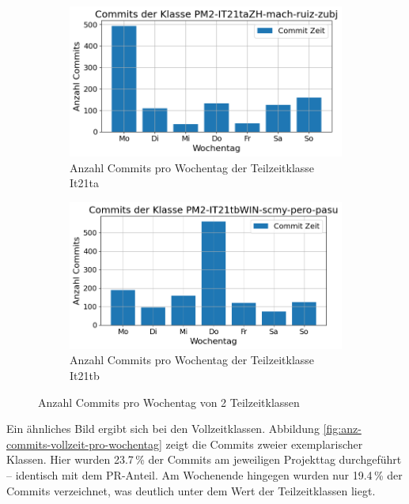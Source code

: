 \begin{figure}[htbp]
    \centering
    \begin{subfigure}[b]{0.48\textwidth}
        \centering
        \includegraphics[width=\textwidth]{Figures/commits-klasse-per-wochentag-21ta.png}
         \caption{Anzahl Commits pro Wochentag der Teilzeitklasse It21ta}
        \label{fig:anzahl-commits-pro-wochentag-it21ta}
    \end{subfigure}
    \hfill
    \begin{subfigure}[b]{0.48\textwidth}
        \centering
        \includegraphics[width=\textwidth]{Figures/commits-klasse-per-wochentag-21tb.png}
         \caption{Anzahl Commits pro Wochentag der Teilzeitklasse It21tb}
        \label{fig:anzahl-commits-pro-wochentag-it21tb}
    \end{subfigure}
    \caption{Anzahl Commits pro Wochentag von 2 Teilzeitklassen}
    \label{fig:anz-commits-teilzeit-pro-wochentag}
\end{figure}

Ein ähnliches Bild ergibt sich bei den Vollzeitklassen. Abbildung \autoref{fig:anz-commits-vollzeit-pro-wochentag} zeigt die Commits zweier exemplarischer Klassen. Hier wurden 23.7\,\% der Commits am jeweiligen Projekttag durchgeführt – identisch mit dem PR-Anteil. Am Wochenende hingegen wurden nur 19.4\,\% der Commits verzeichnet, was deutlich unter dem Wert der Teilzeitklassen liegt.

